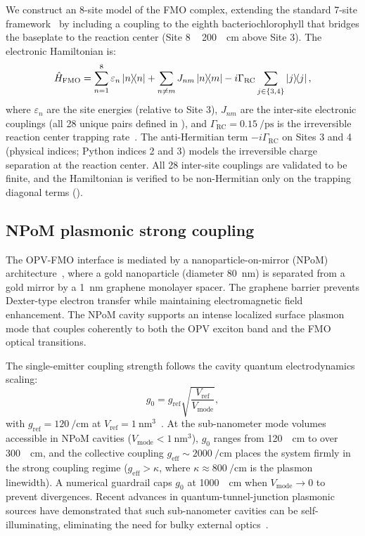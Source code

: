 \documentclass[onecolumn,a4paper,12pt]{article}
\begin{document}
We construct an 8-site model of the FMO complex, extending the standard 7-site framework~\cite{Adolphs2006} by including a coupling to the eighth bacteriochlorophyll that bridges the baseplate to the reaction center (Site 8 ~ \qty{200}{\per\cm} above Site 3).
The electronic Hamiltonian is:
\begin{equation}
\hat{H}_{\mathrm{FMO}} = \sum_{n=1}^{8} \varepsilon_n \dyad{n} + \sum_{n \neq m} J_{nm} \dyad{n}{m} - i\Gamma_{\mathrm{RC}} \sum_{j \in \{3,4\}} \dyad{j}{j},
\label{eq:fmo_hamiltonian}
\end{equation}
where $\varepsilon_n$ are the site energies (relative to Site 3), $J_{nm}$ are the inter-site electronic couplings (all 28 unique pairs defined in ), and $\Gamma_{\mathrm{RC}} = \qty{0.15}{\per\ps}$ is the irreversible reaction center trapping rate~\cite{Renger2003}.
The anti-Hermitian term $-i\Gamma_{\mathrm{RC}}$ on Sites 3 and 4 (physical indices; Python indices 2 and 3) models the irreversible charge separation at the reaction center.
All 28 inter-site couplings are validated to be finite, and the Hamiltonian is verified to be non-Hermitian only on the trapping diagonal terms ().

\subsection*{NPoM plasmonic strong coupling}

The OPV-FMO interface is mediated by a nanoparticle-on-mirror (NPoM) architecture~\cite{Chikkaraddy2016}, where a gold nanoparticle (diameter \qty{80}{\nm}) is separated from a gold mirror by a \qty{1}{\nm} graphene monolayer spacer.
The graphene barrier prevents Dexter-type electron transfer while maintaining electromagnetic field enhancement.
The NPoM cavity supports an intense localized surface plasmon mode that couples coherently to both the OPV exciton band and the FMO optical transitions.

The single-emitter coupling strength follows the cavity quantum electrodynamics scaling:
\begin{equation}
g_0 = g_{\mathrm{ref}} \sqrt{\frac{V_{\mathrm{ref}}}{V_{\mathrm{mode}}}},
\label{eq:coupling_scaling}
\end{equation}
with $g_{\mathrm{ref}} = \qty{120}{\per\cm}$ at $V_{\mathrm{ref}} = \qty{1}{\nm\cubed}$~\cite{Chikkaraddy2016}.
At the sub-nanometer mode volumes accessible in NPoM cavities ($V_{\mathrm{mode}} < \qty{1}{\nm\cubed}$), $g_0$ ranges from \qty{120}{\per\cm} to over \qty{300}{\per\cm}, and the collective coupling $g_{\mathrm{eff}} \sim \qty{2000}{\per\cm}$ places the system firmly in the strong coupling regime ($g_{\mathrm{eff}} > \kappa$, where $\kappa \approx \qty{800}{\per\cm}$ is the plasmon linewidth).
A numerical guardrail caps $g_0$ at \qty{1000}{\per\cm} when $V_{\mathrm{mode}} \to 0$ to prevent divergences.
Recent advances in quantum-tunnel-junction plasmonic sources have demonstrated that such sub-nanometer cavities can be self-illuminating, eliminating the need for bulky external optics~\cite{Lee2025}.
\end{document}
